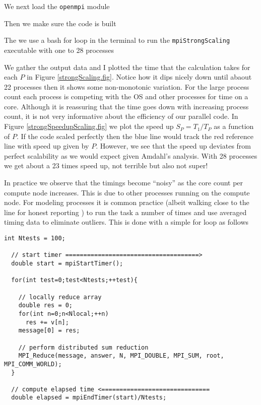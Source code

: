 
We next load the \texttt{openmpi} module 

Then we make sure the code is built

The we use a bash for loop in the terminal to run the \texttt{mpiStrongScaling} executable with one to 28 processes

We gather the output data and I plotted the time that the calculation takes for each $P$ in Figure \ref{strongScaling.fig}. Notice how it dips nicely down until abaout 22 processes then it shows some non-monotonic variation. For the large process count each process is competing with the OS and other processes for time on a core.
Although it is reassuring that the time goes down with increasing process count, it is not very informative about the efficiency of our parallel code. In Figure \ref{strongSpeedupScaling.fig} we plot the speed up $S_P = T_1/T_P$ as a function of $P$. If the code scaled perfectly then the blue line would track the red reference line with speed up given by $P$. However, we see that the speed up deviates from perfect scalability as we would expect given Amdahl's analysis. With 28 processes we get about a 23 times speed up, not terrible but also not super!


In practice we observe that the timings become ``noisy''  as the core count per compute node increases. This is due to other processes running on the compute node. For modeling processes it is common practice (albeit walking close to the line for honest reporting \cite{bailey199112}) to run the task a number of times and use averaged timing data to eliminate outliers. This is done with a simple for loop as follows

\begin{verbatim}
int Ntests = 100;

  // start timer =====================================> 
  double start = mpiStartTimer();

  for(int test=0;test<Ntests;++test){

    // locally reduce array
    double res = 0;
    for(int n=0;n<Nlocal;++n)
      res += v[n];
    message[0] = res;

    // perform distributed sum reduction 
    MPI_Reduce(message, answer, N, MPI_DOUBLE, MPI_SUM, root, MPI_COMM_WORLD);
  }

  // compute elapsed time <==============================
  double elapsed = mpiEndTimer(start)/Ntests;
\end{verbatim}

